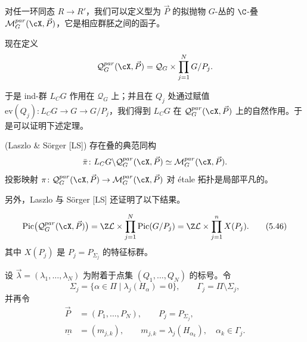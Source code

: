 对任一环同态 $R\to R'$，我们可以定义型为 $\vec P$ 的拟抛物 $G$-丛的 $\C$-叠 $\mathcal M_G^{par}(\cX,\vec P)$，它是相应群胚之间的函子。


现在定义
\[
 \mathcal Q_G^{par}(\cX,\vec P)=\mathcal Q_G\times\prod_{j=1}^N G/P_j.
\]



于是 ind-群 $L_CG$ 作用在 $\mathcal Q_G$ 上；并且在 $Q_j$ 处通过赋值 $\mathrm{ev}(Q_j)\colon L_CG\to G\to G/P_j$，我们得到 $L_CG$ 在 $\mathcal Q_G^{par}(\cX,\vec P)$ 上的自然作用。于是可以证明下述定理。

\begin{theorem}[5.25] (Laszlo \& Sörger [LS])
存在叠的典范同构
\[
 \bar\pi\colon L_CG\backslash\mathcal Q_G^{par}(\cX,\vec P)\simeq\mathcal M_G^{par}(\cX,\vec P).
\]
投影映射 $\pi\colon\mathcal Q_G^{par}(\cX,\vec P)\to\mathcal M_G^{par}(\cX,\vec P)$ 对 étale 拓扑是局部平凡的。
\end{theorem}


另外，Laszlo 与 Sörger [LS] 还证明了以下结果。

\begin{theorem}[5.26]
\begin{equation}
 \operatorname{Pic}\bigl(\mathcal Q_G^{par}(\cX,\vec P)\bigr)=\Z\mathcal L\times\prod_{j=1}^N\operatorname{Pic}(G/P_j)
 =\Z\mathcal L\times\prod_{j=1}^n X(P_j). \tag{5.46}
\end{equation}
其中 $X(P_j)$ 是 $P_j=P_{\Sigma_j}$ 的特征标群。
\end{theorem}


设 $\vec\lambda=(\lambda_1,\dots,\lambda_N)$ 为附着于点集 $(Q_1,\dots,Q_N)$ 的标号。令
\[
 \Sigma_j=\{\alpha\in\Pi\mid\lambda_j(H_\alpha)=0\},\qquad \Gamma_j=\Pi\setminus\Sigma_j,
\]
并再令
\begin{align*}
 \vec P&=(P_1,\dots,P_N),\qquad P_j=P_{\Sigma_j},\\
 \underline m&=(m_{j,k}),\qquad m_{j,k}=\lambda_j(H_{\alpha_k}),\quad \alpha_k\in\Gamma_j.
\end{align*}


